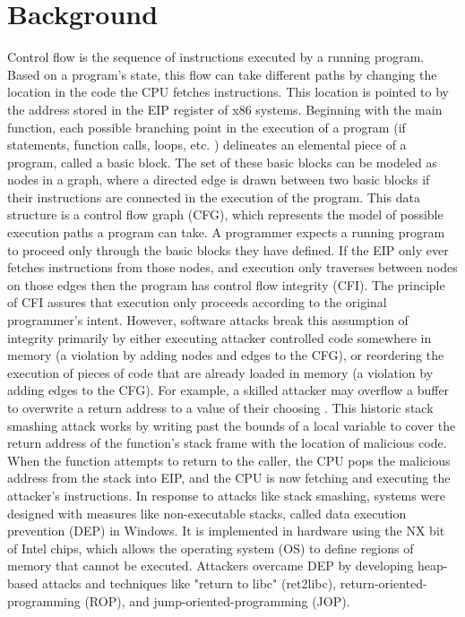 \documentclass[letterpaper,10pt]{article}
\begin{document}
\section{Background}
Control flow is the sequence of instructions executed by a running program. Based on a program’s state, this flow can take different paths by changing the location in the code the CPU fetches instructions. This location is pointed to by the address stored in the EIP register of x86 systems. Beginning with the main function, each possible branching point in the execution of a program (if statements, function calls, loops, etc. ) delineates an elemental piece of a program, called a basic block. The set of these basic blocks can be modeled as nodes in a graph, where a directed edge is drawn between two basic blocks if their instructions are connected in the execution of the program. This data structure is a control flow graph (CFG), which represents the model of possible execution paths a program can take. A programmer expects a running program to proceed only through the basic blocks they have defined. If the EIP only ever fetches instructions from those nodes, and execution only traverses between nodes on those edges then the program has control flow integrity (CFI). The principle of CFI assures that execution only proceeds according to the original programmer's intent.
\newline
\indent However, software attacks break this assumption of integrity primarily by either executing attacker controlled code somewhere in memory (a violation by adding nodes and edges to the CFG), or reordering the execution of pieces of code that are already loaded in memory (a violation by adding edges to the CFG). For example, a skilled attacker may overflow a buffer to overwrite a return address to a value of their choosing \cite{alephone}. This historic stack smashing attack works by writing past the bounds of a local variable to cover the return address of the function's stack frame with the location of malicious code\cite{alephone}. When the function attempts to return to the caller, the CPU pops the malicious address from the stack into EIP, and the CPU is now fetching and executing the attacker's instructions.
\newline
\indent	In response to attacks like stack smashing, systems were designed with measures like non-executable stacks, called data execution prevention (DEP) in Windows. It is implemented in hardware using the NX bit of Intel chips, which allows the operating system (OS) to define regions of memory that cannot be executed. Attackers overcame DEP by developing heap-based attacks and techniques like "return to libc" (ret2libc), return-oriented-programming (ROP), and jump-oriented-programming (JOP).
\end{document}
